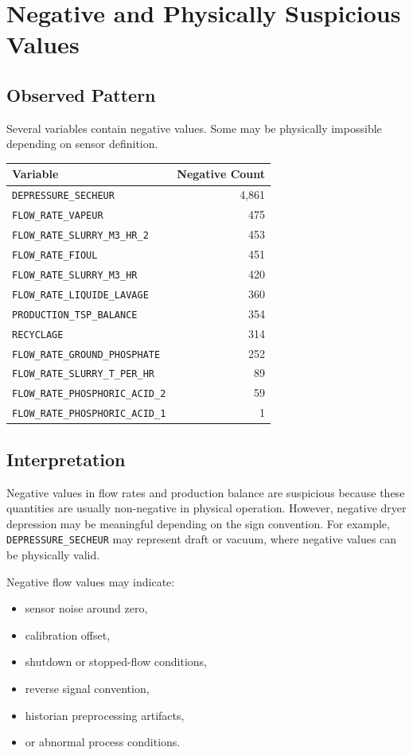 \documentclass[11pt,a4paper]{article}
\begin{document}
\section{Negative and Physically Suspicious Values}

\subsection{Observed Pattern}

Several variables contain negative values. Some may be physically impossible depending on sensor definition.

\begin{longtable}{p{8cm}r}
\toprule
Variable & Negative Count \\
\midrule
\texttt{DEPRESSURE\_SECHEUR} & 4,861 \\
\texttt{FLOW\_RATE\_VAPEUR} & 475 \\
\texttt{FLOW\_RATE\_SLURRY\_M3\_HR\_2} & 453 \\
\texttt{FLOW\_RATE\_FIOUL} & 451 \\
\texttt{FLOW\_RATE\_SLURRY\_M3\_HR} & 420 \\
\texttt{FLOW\_RATE\_LIQUIDE\_LAVAGE} & 360 \\
\texttt{PRODUCTION\_TSP\_BALANCE} & 354 \\
\texttt{RECYCLAGE} & 314 \\
\texttt{FLOW\_RATE\_GROUND\_PHOSPHATE} & 252 \\
\texttt{FLOW\_RATE\_SLURRY\_T\_PER\_HR} & 89 \\
\texttt{FLOW\_RATE\_PHOSPHORIC\_ACID\_2} & 59 \\
\texttt{FLOW\_RATE\_PHOSPHORIC\_ACID\_1} & 1 \\
\bottomrule
\end{longtable}

\subsection{Interpretation}

Negative values in flow rates and production balance are suspicious because these quantities are usually non-negative in physical operation. However, negative dryer depression may be meaningful depending on the sign convention. For example, \texttt{DEPRESSURE\_SECHEUR} may represent draft or vacuum, where negative values can be physically valid.

Negative flow values may indicate:

\begin{itemize}
    \item sensor noise around zero,
    \item calibration offset,
    \item shutdown or stopped-flow conditions,
    \item reverse signal convention,
    \item historian preprocessing artifacts,
    \item or abnormal process conditions.
\end{itemize}
\end{document}
